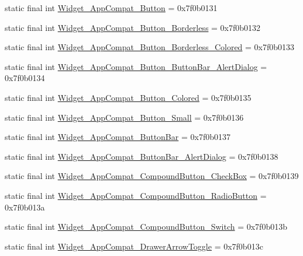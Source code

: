 \begin{CompactItemize}
\item 
static final int \hyperlink{classandroid_1_1support_1_1transition_1_1_r_1_1style_d555f2e715e5b180bbb0ac4437f55d9f}{Widget\_\-AppCompat\_\-Button} = 0x7f0b0131
\item 
static final int \hyperlink{classandroid_1_1support_1_1transition_1_1_r_1_1style_a90dcaaddae1f11b00efa5ca47efe9f8}{Widget\_\-AppCompat\_\-Button\_\-Borderless} = 0x7f0b0132
\item 
static final int \hyperlink{classandroid_1_1support_1_1transition_1_1_r_1_1style_114e23b2361ddb1d9ca69bfd91989839}{Widget\_\-AppCompat\_\-Button\_\-Borderless\_\-Colored} = 0x7f0b0133
\item 
static final int \hyperlink{classandroid_1_1support_1_1transition_1_1_r_1_1style_eae3704e2bcdd4705945a7aa971a2186}{Widget\_\-AppCompat\_\-Button\_\-ButtonBar\_\-AlertDialog} = 0x7f0b0134
\item 
static final int \hyperlink{classandroid_1_1support_1_1transition_1_1_r_1_1style_fd39195168f8be1301a20a1c720003db}{Widget\_\-AppCompat\_\-Button\_\-Colored} = 0x7f0b0135
\item 
static final int \hyperlink{classandroid_1_1support_1_1transition_1_1_r_1_1style_27f0fe1c50d3f0512683fecdb36ac06d}{Widget\_\-AppCompat\_\-Button\_\-Small} = 0x7f0b0136
\item 
static final int \hyperlink{classandroid_1_1support_1_1transition_1_1_r_1_1style_35297fb010394723ef3be873e334d76d}{Widget\_\-AppCompat\_\-ButtonBar} = 0x7f0b0137
\item 
static final int \hyperlink{classandroid_1_1support_1_1transition_1_1_r_1_1style_9547ea8d590b83af80197be3febeae71}{Widget\_\-AppCompat\_\-ButtonBar\_\-AlertDialog} = 0x7f0b0138
\item 
static final int \hyperlink{classandroid_1_1support_1_1transition_1_1_r_1_1style_52f67f7679d8b2a4b370777fb6a07b7a}{Widget\_\-AppCompat\_\-CompoundButton\_\-CheckBox} = 0x7f0b0139
\item 
static final int \hyperlink{classandroid_1_1support_1_1transition_1_1_r_1_1style_001c116b290d03bde7ab4ca58ce47d34}{Widget\_\-AppCompat\_\-CompoundButton\_\-RadioButton} = 0x7f0b013a
\item 
static final int \hyperlink{classandroid_1_1support_1_1transition_1_1_r_1_1style_207b68201a2bc8540b410c3328848484}{Widget\_\-AppCompat\_\-CompoundButton\_\-Switch} = 0x7f0b013b
\item 
static final int \hyperlink{classandroid_1_1support_1_1transition_1_1_r_1_1style_05f561c28260f594ba4197750d306085}{Widget\_\-AppCompat\_\-DrawerArrowToggle} = 0x7f0b013c

\end{CompactItemize}
